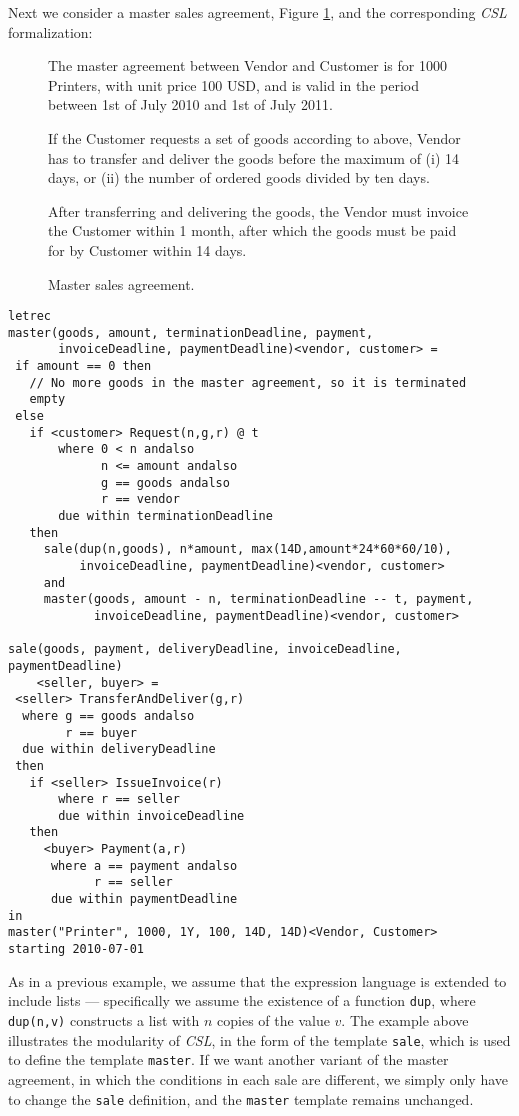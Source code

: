 \documentclass[orivec,final]{llncs-href}
\newcommand{\csl}{\textit{CSL}}
\newcounter{paragraphcounter}
\newenvironment{papercontract}
  {\begin{list}{\textbf{Paragraph \arabic{paragraphcounter}.}}{\usecounter{paragraphcounter}\leftmargin=0pt\itemindent=17pt\rightmargin=0pt\topsep=7pt\itemsep=2pt}}
  {\end{list}}
\begin{document}
Next we consider a master sales agreement, Figure \ref{fig:master},
and the corresponding \csl{} formalization:
\begin{figure}[t]
  \begin{papercontract}
  \item The master agreement between Vendor and Customer is for 1000
    Printers, with unit price 100 USD, and is valid in the period
    between 1st of July 2010 and 1st of July 2011.
  \item If the Customer requests a set of goods according to above,
    Vendor has to transfer and deliver the goods before the maximum
    of (i) 14 days, or (ii) the number of ordered goods divided by ten
    days.
  \item After transferring and delivering the goods, the Vendor must
    invoice the Customer within 1 month, after which the goods must be
    paid for by Customer within 14 days.
  \end{papercontract}
  \caption{Master sales agreement.}\label{fig:master}
\end{figure}
\begin{lstlisting}[language=csl]
letrec
master(goods, amount, terminationDeadline, payment,
       invoiceDeadline, paymentDeadline)<vendor, customer> =
 if amount == 0 then
   // No more goods in the master agreement, so it is terminated
   empty
 else
   if <customer> Request(n,g,r) @ t
       where 0 < n andalso
             n <= amount andalso
             g == goods andalso
             r == vendor
       due within terminationDeadline
   then
     sale(dup(n,goods), n*amount, max(14D,amount*24*60*60/10),
          invoiceDeadline, paymentDeadline)<vendor, customer>
     and
     master(goods, amount - n, terminationDeadline -- t, payment,
            invoiceDeadline, paymentDeadline)<vendor, customer>

sale(goods, payment, deliveryDeadline, invoiceDeadline, paymentDeadline)
    <seller, buyer> =
 <seller> TransferAndDeliver(g,r)
  where g == goods andalso
        r == buyer
  due within deliveryDeadline
 then
   if <seller> IssueInvoice(r)
       where r == seller
       due within invoiceDeadline
   then
     <buyer> Payment(a,r)
      where a == payment andalso
            r == seller
      due within paymentDeadline
in
master("Printer", 1000, 1Y, 100, 14D, 14D)<Vendor, Customer>
starting 2010-07-01
\end{lstlisting}
As in a previous example, we assume that the expression language is
extended to include lists --- specifically we assume the existence of
a function \texttt{dup}, where \texttt{dup(n,v)} constructs a list
with $n$ copies of the value $v$. The example above illustrates the
modularity of \csl{}, in the form of the template \texttt{sale}, which
is used to define the template \texttt{master}. If we want another
variant of the master agreement, in which the conditions in each sale
are different, we simply only have to change the \texttt{sale}
definition, and the \texttt{master} template remains unchanged.
\end{document}
